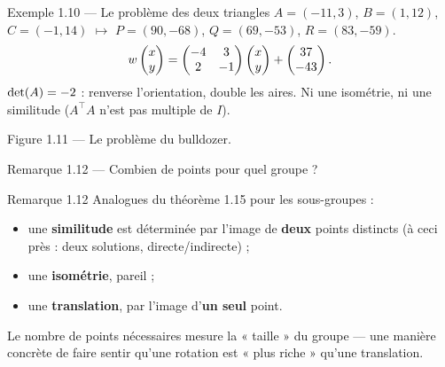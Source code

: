 \begin{frame}{Exemple 1.10 --- Le problème des deux triangles}
  \small $A=(-11,3)$, $B=(1,12)$, $C=(-1,14)$
  $\longmapsto$ $P=(90,-68)$, $Q=(69,-53)$, $R=(83,-59)$.
  \[
    w\begin{pmatrix}x\\ y\end{pmatrix} = \begin{pmatrix}-4 & 3\\ 2 & -1\end{pmatrix}\begin{pmatrix}x\\ y\end{pmatrix} + \begin{pmatrix}37\\ -43\end{pmatrix}.
  \]
  $\operatorname{det}(A)=-2$ : renverse l'orientation, double les aires. Ni une
  isométrie, ni une similitude ($A^\top A$ n'est pas multiple de $I$).
  \begin{center}\small Figure 1.11 --- Le problème du bulldozer.\end{center}
\end{frame}

\begin{frame}{Remarque 1.12 --- Combien de points pour quel groupe ?}
  \begin{Rem}{Remarque 1.12}
    \small Analogues du théorème 1.15 pour les sous-groupes :
    \begin{itemize}
      \item une \textbf{similitude} est déterminée par l'image de
        \textbf{deux} points distincts (à ceci près : deux solutions,
        directe/indirecte) ;
      \item une \textbf{isométrie}, pareil ;
      \item une \textbf{translation}, par l'image d'\textbf{un seul}
        point.
    \end{itemize}
    Le nombre de points nécessaires mesure la « taille » du groupe ---
    une manière concrète de faire sentir qu'une rotation est « plus
    riche » qu'une translation.
  \end{Rem}
\end{frame}
